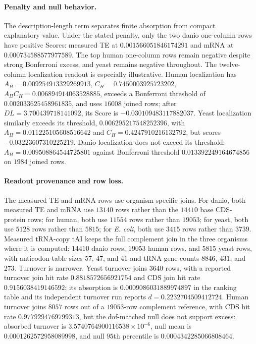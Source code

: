 \paragraph{Penalty and null behavior.}
The description-length term separates finite absorption from compact explanatory value.  Under the stated penalty, only the two danio one-column rows have positive Scores: measured TE at $0.001566051846174291$ and mRNA at $0.000734588577977589$.  The top human one-column rows remain negative despite strong Bonferroni excess, and yeast remains negative throughout.  The twelve-column localization readout is especially illustrative.  Human localization has $A_H=0.009254913329269913$, $C_H=0.7450003925723202$, $A_HC_H=0.006894914063528885$, exceeds a Bonferroni threshold of $0.002033625458961835$, and uses $16008$ joined rows; after $DL=3.700439718141092$, its Score is $-0.030109483117882037$.  Yeast localization similarly exceeds its threshold, $0.006295217548252396$, with $A_H=0.011225105608516642$ and $C_H=0.4247910216132792$, but scores $-0.03223607310225219$.  Danio localization does not exceed its threshold: $A_H=0.009508864544725801$ against Bonferroni threshold $0.013392249164674856$ on $1984$ joined rows.

\paragraph{Readout provenance and row loss.}
The measured TE and mRNA rows use organism-specific joins.  For danio, both measured TE and mRNA use $13140$ rows rather than the $14410$ base CDS-protein rows; for human, both use $11554$ rows rather than $19053$; for yeast, both use $5128$ rows rather than $5815$; for \emph{E. coli}, both use $3415$ rows rather than $3739$.  Measured tRNA-copy tAI keeps the full complement join in the three organisms where it is computed: $14410$ danio rows, $19053$ human rows, and $5815$ yeast rows, with anticodon table sizes $57$, $47$, and $41$ and tRNA-gene counts $8846$, $431$, and $273$.  Turnover is narrower.  Yeast turnover joins $3640$ rows, with a reported turnover join hit rate $0.8818572656921754$ and CDS join hit rate $0.9156038419146592$; its absorption is $0.0009086031889974897$ in the ranking table and its independent turnover run reports $d=0.2232704509412724$.  Human turnover joins $8057$ rows out of a $19053$-row complement reference, with CDS hit rate $0.9779294769799313$, but the dof-matched null does not support excess: absorbed turnover is $3.5740764900116538\times 10^{-6}$, null mean is $0.0001262572958089998$, and null $95$th percentile is $0.0004342285066808464$.

